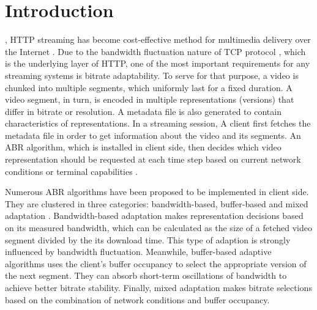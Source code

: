 \documentclass[journal]{IEEEtran}
\begin{document}
%
\IEEEpeerreviewmaketitle



\section{Introduction}
% 
% 
% 
% 
, HTTP streaming has become cost-effective method for multimedia delivery over the Internet \cite{thang}. Due to the bandwidth fluctuation nature of TCP protocol \cite{bandwidth fluc}, which is the underlying layer of HTTP, one of the most important requirements for any streaming systems is bitrate adaptability. To serve for that purpose, a video is chunked into multiple segments, which uniformly last for a fixed duration. A video segment, in turn, is encoded in multiple representations (versions) that differ in bitrate or resolution. A metadata file is also generated to contain characteristics of representations. In a streaming session, A client first fetches the metadata file in order to get information about the video and its segments. An ABR algorithm, which is installed in client side, then decides which video representation should be requested at each time step based on current network conditions or terminal capabilities \cite{general HTTP}. 
\par Numerous ABR algorithms have been proposed to be implemented in client side. They are clustered in three categories: bandwidth-based, buffer-based and mixed adaptation \cite{ABR cats}. Bandwidth-based adaptation makes representation decisions based on its measured bandwidth, which can be calculated as the size of a fetched video segment divided by the its download time. This type of adaption is strongly influenced by bandwidth fluctuation. Meanwhile, buffer-based adaptive algorithms uses the client's buffer occupancy to select the appropriate version of the next segment.  They can absorb short-term oscillations of bandwidth to achieve better bitrate stability. Finally, mixed adaptation makes bitrate selections based on the combination of network conditions and buffer occupancy.  
\end{document}
